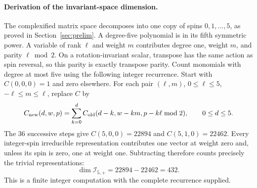 \documentclass[11pt,a4paper]{article}
\begin{document}
\paragraph{Derivation of the invariant-space dimension.}
The complexified matrix space decomposes into one copy of spins
$0,1,\ldots,5$, as proved in Section~\ref{sec:prelim}.
A degree-five polynomial is in its fifth symmetric power. A variable
of rank $\ell$ and weight $m$ contributes degree one, weight $m$,
and parity $\ell\bmod2$. On a rotation-invariant scalar,
transpose has the same action as spin reversal, so this parity is
exactly transpose parity. Count monomials with degree at most five
using the following integer recurrence. Start with $C(0,0,0)=1$
and zero elsewhere. For each pair $(\ell,m)$, $0\le\ell\le5$,
$-\ell\le m\le\ell$, replace $C$ by
\[
 C_{\rm new}(d,w,p)=\sum_{k=0}^d
 C_{\rm old}(d-k,w-km,p-k\ell\bmod2),\qquad 0\le d\le5.
\]
The 36 successive steps give
$C(5,0,0)=22894$ and $C(5,1,0)=22462$.
Every integer-spin irreducible representation contributes one vector
at weight zero and, unless its spin is zero, one at weight one.
Subtracting therefore counts precisely the trivial representations:
\[
 \dim\mathcal I_{5,+}=22894-22462=432.
\]
This is a finite integer computation with the complete recurrence supplied.
\end{document}
